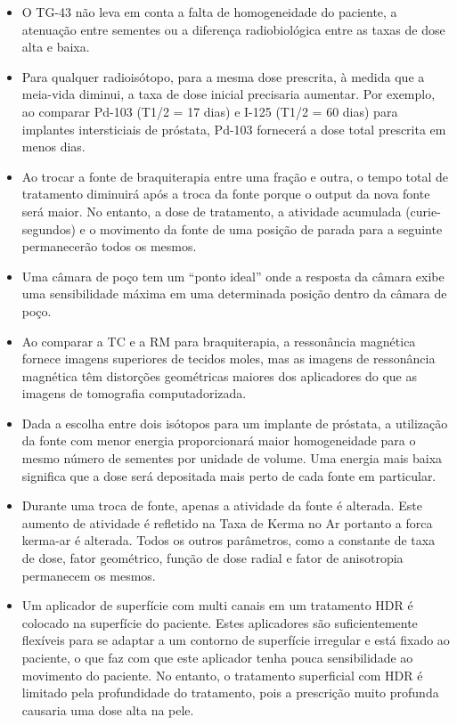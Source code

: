 \documentclass[11pt,a4paper]{article}
\newcounter{exemplo}
\begin{document}
\begin{exemplo}[Braquiterapia]
\begin{itemize}
        
        \item O TG-43 não leva em conta a falta de homogeneidade do paciente, a atenuação entre sementes ou a diferença radiobiológica entre as taxas de dose alta e baixa.
        
        \item Para qualquer radioisótopo, para a mesma dose prescrita, à medida que a meia-vida diminui, a taxa de dose inicial precisaria aumentar. Por exemplo, ao comparar Pd-103 (T1/2 = 17 dias) e I-125 (T1/2 = 60 dias) para implantes intersticiais de próstata, Pd-103 fornecerá a dose total prescrita em menos dias.
        
        \item Ao trocar a fonte de braquiterapia entre uma fração e outra, o tempo total de tratamento diminuirá após a troca da fonte porque o output da nova fonte será maior. No entanto, a dose de tratamento, a atividade acumulada (curie-segundos) e o movimento da fonte de uma posição de parada para a seguinte permanecerão todos os mesmos.
        
        \item Uma câmara de poço tem um “ponto ideal” onde a resposta da câmara exibe uma sensibilidade máxima em uma determinada posição dentro da câmara de poço.
        
        \item Ao comparar a TC e a RM para braquiterapia, a ressonância magnética fornece imagens superiores de tecidos moles, mas as imagens de ressonância magnética têm distorções geométricas maiores dos aplicadores do que as imagens de tomografia computadorizada.  
        
        \item Dada a escolha entre dois isótopos para um implante de próstata, a utilização da fonte com menor energia proporcionará maior homogeneidade para o mesmo número de sementes por unidade de volume. Uma energia mais baixa significa que a dose será depositada mais perto de cada fonte em particular.
        
        \item Durante uma troca de fonte, apenas a atividade da fonte é alterada. Este aumento de atividade é refletido na Taxa de Kerma no Ar portanto a forca kerma-ar é alterada. Todos os outros parâmetros, como a constante de taxa de dose, fator geométrico, função de dose radial e fator de anisotropia permanecem os mesmos.
        
        \item Um aplicador de superfície com multi canais em um tratamento HDR é colocado na superfície do paciente. Estes aplicadores são suficientemente flexíveis para se adaptar a um contorno de superfície irregular e está fixado ao paciente, o que faz com que este aplicador tenha pouca sensibilidade ao movimento do paciente. No entanto, o tratamento superficial com HDR é limitado pela profundidade do tratamento, pois a prescrição muito profunda causaria uma dose alta na pele.
        

\end{itemize}
\end{exemplo}
\end{document}
